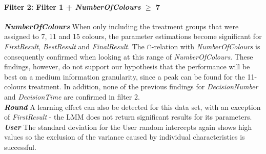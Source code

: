 
\paragraph{Filter 2: Filter 1 + \textit{NumberOfColours} $\geq$ 7}
\textbf{\textit{NumberOfColours} } When only including the treatment groups that were assigned to 7, 11 and 15 colours, the parameter estimations become significant for \textit{FirstResult}, \textit{BestResult} and \textit{FinalResult}. The \textbf{$\cap$}-relation with \textit{NumberOfColours} is consequently confirmed when looking at this range of \textit{NumberOfColours}. These findings, however, do not support our hypothesis that the performance will be best on a medium information granularity, since a peak can be found for the 11-colours treatment. In addition, none of the previous findings for \textit{DecisionNumber} and \textit{DecisionTime} are confirmed in filter 2.\\
\textbf{\textit{Round} } A learning effect can also be detected for this data set, with an exception of \textit{FirstResult} - the \ac{LMM} does not return significant results for its parameters. \\
\textbf{\textit{User} } The standard deviation for the User random intercepts again shows high values so the exclusion of the variance caused by individual characteristics is successful.\\

